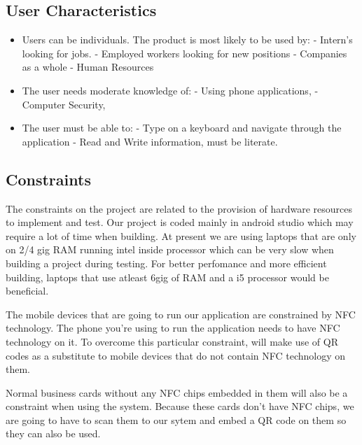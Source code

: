 \documentclass[english]{article}
\begin{document}
				\subsection{User Characteristics}
				\begin{itemize}
					\item
					Users can be individuals. The product is most likely to be used by:
					\subitem
					- Intern's looking for jobs.
					\subitem
					- Employed workers looking for new positions
					\subitem
					- Companies as a whole
					\subitem
					- Human Resources
					\item 
					The user needs moderate knowledge of:
					\subitem 
					- Using phone applications, 
					\subitem 
					- Computer Security,  
					\item 
					The user must be able to: 
					\subitem
					- Type on a keyboard and navigate through the application
					\subitem
					- Read and Write information, must be literate.
				\end{itemize}
				
			
				\subsection{Constraints}
            
				
				The constraints on the project are related to the provision of hardware resources to implement and test. 				 Our project is coded
				mainly in android studio which may require a lot of time when building. At present we are using laptops                                 that are only on 2/4 gig RAM
                                running intel inside processor which can be very slow when building a project during testing. For better                                 perfomance and more efficient
                                building, laptops that use atleast 6gig of RAM and a i5 processor would be beneficial.\par

                                The mobile devices that are going to run our application are constrained by NFC technology. The phone                                   you're using to run the application needs to have NFC technology on it. To overcome this particular                                     constraint, will make use of QR codes as a substitute to mobile devices that do not contain NFC                                         technology on them. 

                                Normal business cards without any NFC chips embedded in them will also be a constraint when using the                                   system. Because these cards don't have NFC chips, we are going to have  to scan them to our sytem and                                   embed a QR code on them so they can also be used.
\end{document}
